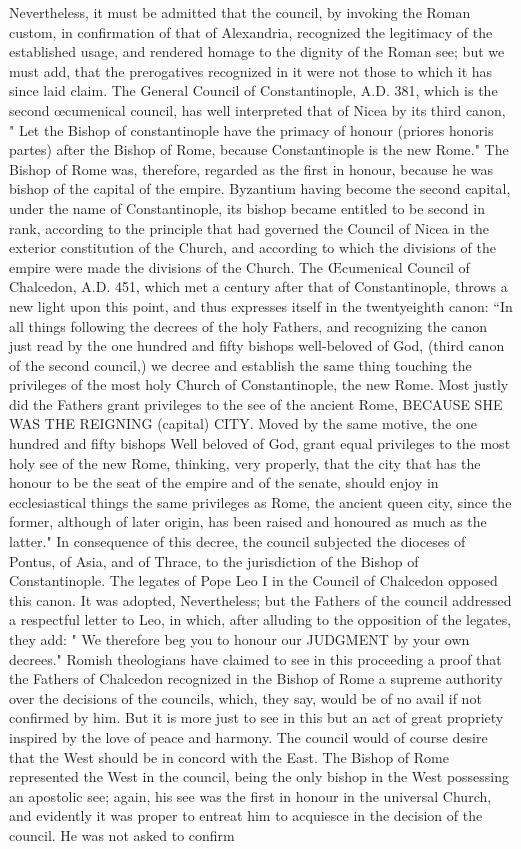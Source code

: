 Nevertheless, it must be admitted that the council, by invoking the Roman custom, in confirmation of that of Alexandria, recognized the legitimacy of the established usage, and rendered homage to the dignity of the Roman see; but we must add, that the prerogatives recognized in it were not those to which it has since laid claim. The General Council of Constantinople, A.D. 381, which is the second œcumenical council, has well interpreted that of Nicea by its third canon, " Let the Bishop of constantinople have the primacy of honour (priores honoris partes) after the Bishop of Rome, because Constantinople is the new Rome." The Bishop of Rome was, therefore, regarded as the first in honour, because he was bishop of the capital of the empire. Byzantium having become the second capital, under the name of Constantinople, its bishop became entitled to be second in rank, according to the principle that had governed the Council of Nicea in the exterior constitution of the Church, and according to which the divisions of the empire were made the divisions of the Church. The Œcumenical Council of Chalcedon, A.D. 451, which met a century after that of Constantinople, throws a new light upon this point, and thus expresses itself in the twentyeighth canon: “In all things following the decrees of the holy Fathers, and recognizing the canon just read by the one hundred and fifty bishops well-beloved of God, (third canon of the second council,) we decree and establish the same thing touching the privileges of the most holy Church of Constantinople, the new Rome. Most justly did the Fathers grant privileges to the see of the ancient Rome, BECAUSE SHE WAS THE REIGNING (capital) CITY. Moved by the same motive, the one hundred and fifty bishops Well beloved of God, grant equal privileges to the most holy see of the new Rome, thinking, very properly, that the city that has the honour to be the seat of the empire and of the senate, should enjoy in ecclesiastical things the same privileges as Rome, the ancient queen city, since the former, although of later origin, has been raised and honoured as much as the latter." In consequence of this decree, the council subjected the dioceses of Pontus, of Asia, and of Thrace, to the jurisdiction of the Bishop of Constantinople. The legates of Pope Leo I in the Council of Chalcedon opposed this canon. It was adopted, Nevertheless; but the Fathers of the council addressed a respectful letter to Leo, in which, after alluding to the opposition of the legates, they add: " We therefore beg you to honour our JUDGMENT by your own decrees." Romish theologians have claimed to see in this proceeding a proof that the Fathers of Chalcedon recognized in the Bishop of Rome a supreme authority over the decisions of the councils, which, they say, would be of no avail if not confirmed by him. But it is more just to see in this but an act of great propriety inspired by the love of peace and harmony. The council would of course desire that the West should be in concord with the East. The Bishop of Rome represented the West in the council, being the only bishop in the West possessing an apostolic see; again, his see was the first in honour in the universal Church, and evidently it was proper to entreat him to acquiesce in the decision of the council. He was not asked to confirm 
